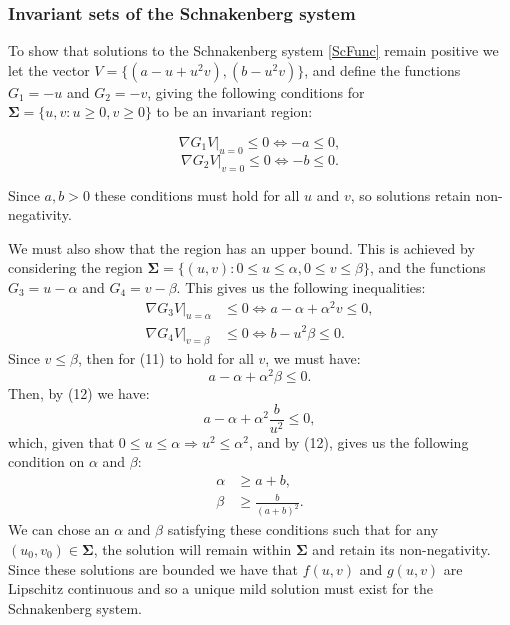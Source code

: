 \documentclass[12pt]{article}
\begin{document}
\subsubsection{Invariant sets of the Schnakenberg system}
To show that solutions to the Schnakenberg system \eqref{ScFunc} remain positive we let the vector $V   = \lbrace (a - u +u^2v), (b - u^2v) \rbrace $, and define the functions $G_1 = -u$ and $G_2 = -v$, giving the following conditions for $\mathbf{\Sigma} = \lbrace u, v : u\geq 0, v\geq 0 \rbrace$ to be an invariant region:

$$ \left. \nabla G_1 V \right|_{u=0} \leq 0 \Longleftrightarrow -a \leq 0,$$
$$ \left. \nabla G_2 V \right|_{v=0} \leq 0 \Longleftrightarrow -b \leq 0.$$

Since $a,b > 0$ these conditions must hold for all $u$ and $v$, so solutions retain non-negativity. 

We must also show that the region has an upper bound. This is achieved by considering the region $\mathbf{\Sigma} = \lbrace (u,v) : 0\leq u \leq \alpha, 0\leq v \leq \beta\rbrace$, and the functions $G_3 = u - \alpha$ and $G_4 = v - \beta$. This gives us the following inequalities:
\begin{align}
 \left. \nabla G_3 V \right|_{u=\alpha} &\leq 0 \Longleftrightarrow a -\alpha + \alpha^2v \leq 0,\\
\left. \nabla G_4 V \right|_{v=\beta} &\leq 0 \Longleftrightarrow b-u^2\beta \leq 0.
\end{align}
Since $v \leq \beta$, then for (11) to hold for all $v$, we must have:
$$a -\alpha + \alpha^2\beta \leq 0.$$
Then, by (12) we have:
$$a -\alpha + \alpha^2\frac{b}{u^2} \leq 0,$$
which, given that $0\leq u \leq \alpha \Longrightarrow u^2 \leq \alpha^2$, and by (12), gives us the following condition on $\alpha$ and $\beta$:
\begin{align*}
\alpha &\geq a+b,\\
\beta&\geq\frac{b}{(a+b)^2}.
\end{align*}
We can chose an $\alpha$ and $\beta$ satisfying these conditions such that for any $(u_0,v_0) \in \mathbf{\Sigma}$, the solution will remain within $\mathbf{\Sigma}$ and retain its non-negativity. Since these solutions are bounded we have that $f(u,v)$ and $g(u,v)$ are Lipschitz continuous and so a unique mild solution must exist for the Schnakenberg system. 
\end{document}

